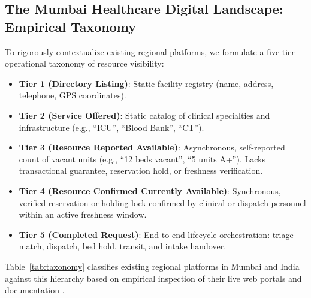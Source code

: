 \documentclass[conference]{IEEEtran}
\begin{document}
\subsection{The Mumbai Healthcare Digital Landscape: Empirical Taxonomy}
To rigorously contextualize existing regional platforms, we formulate a five-tier operational taxonomy of resource visibility:
\begin{itemize}
    \item \textbf{Tier 1 (Directory Listing)}: Static facility registry (name, address, telephone, GPS coordinates).
    \item \textbf{Tier 2 (Service Offered)}: Static catalog of clinical specialties and infrastructure (e.g., ``ICU'', ``Blood Bank'', ``CT'').
    \item \textbf{Tier 3 (Resource Reported Available)}: Asynchronous, self-reported count of vacant units (e.g., ``12 beds vacant'', ``5 units A+''). Lacks transactional guarantee, reservation hold, or freshness verification.
    \item \textbf{Tier 4 (Resource Confirmed Currently Available)}: Synchronous, verified reservation or holding lock confirmed by clinical or dispatch personnel within an active freshness window.
    \item \textbf{Tier 5 (Completed Request)}: End-to-end lifecycle orchestration: triage match, dispatch, bed hold, transit, and intake handover.
\end{itemize}

Table~\ref{tab:taxonomy} classifies existing regional platforms in Mumbai and India against this hierarchy based on empirical inspection of their live web portals and documentation \cite{mohfw2019ndhb,nha2023hfr,kadambi2026ayushman}.
\end{document}
